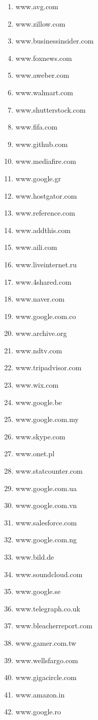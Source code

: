 \begin{enumerate}
\item www.avg.com
\item www.zillow.com
\item www.businessinsider.com
\item www.foxnews.com
\item www.aweber.com
\item www.walmart.com
\item www.shutterstock.com
\item www.fifa.com
\item www.github.com
\item www.mediafire.com
\item www.google.gr
\item www.hostgator.com
\item www.reference.com
\item www.addthis.com
\item www.aili.com
\item www.liveinternet.ru
\item www.4shared.com
\item www.naver.com
\item www.google.com.co
\item www.archive.org
\item www.ndtv.com
\item www.tripadvisor.com
\item www.wix.com
\item www.google.be
\item www.google.com.my
\item www.skype.com
\item www.onet.pl
\item www.statcounter.com
\item www.google.com.ua
\item www.google.com.vn
\item www.salesforce.com
\item www.google.com.ng
\item www.bild.de
\item www.soundcloud.com
\item www.google.se
\item www.telegraph.co.uk
\item www.bleacherreport.com
\item www.gamer.com.tw
\item www.wellsfargo.com
\item www.gigacircle.com
\item www.amazon.in
\item www.google.ro

\end{enumerate}
